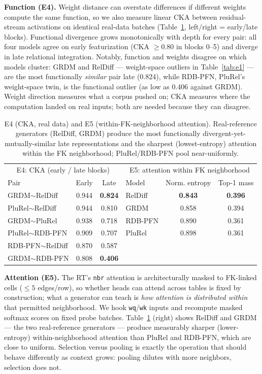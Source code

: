 \documentclass{article}
\begin{document}
\textbf{Function (E4).} Weight distance can overstate differences if different weights compute the same function, so we also measure linear CKA between residual-stream activations on identical real-data batches (Table~\ref{tab:e4cka}, left/right = early/late blocks). Functional divergence grows monotonically with depth for every pair: all four models agree on early featurization (CKA $\geq 0.80$ in blocks 0--5) and diverge in late relational integration. Notably, function and weights disagree on which models cluster: GRDM and RelDiff --- weight-space outliers in Table~\ref{tab:e1} --- are the most functionally \emph{similar} pair late (0.824), while RDB-PFN, PluRel's weight-space twin, is the functional outlier (as low as 0.406 against GRDM). Weight direction measures what a corpus pushed on; CKA measures where the computation landed on real inputs; both are needed because they can disagree.

\begin{table}[t]
\caption{E4 (CKA, real data) and E5 (within-FK-neighborhood attention). Real-reference generators (RelDiff, GRDM) produce the most functionally divergent-yet-mutually-similar late representations and the sharpest (lowest-entropy) attention within the FK neighborhood; PluRel/RDB-PFN pool near-uniformly.}
\label{tab:e4cka}
\centering
\small
\begin{tabular}{lcc|lcc}
\toprule
\multicolumn{3}{c|}{E4: CKA (early / late blocks)} & \multicolumn{3}{c}{E5: attention within FK neighborhood} \\
Pair & Early & Late & Model & Norm. entropy & Top-1 mass \\
\midrule
GRDM$\sim$RelDiff  & 0.944 & \textbf{0.824} & RelDiff & \textbf{0.843} & \textbf{0.396} \\
PluRel$\sim$RelDiff& 0.944 & 0.810          & GRDM    & 0.858 & 0.394 \\
GRDM$\sim$PluRel   & 0.938 & 0.718          & RDB-PFN & 0.890 & 0.361 \\
PluRel$\sim$RDB-PFN& 0.909 & 0.707          & PluRel  & 0.898 & 0.361 \\
RDB-PFN$\sim$RelDiff&0.870 & 0.587          & & & \\
GRDM$\sim$RDB-PFN  & 0.808 & \textbf{0.406} & & & \\
\bottomrule
\end{tabular}
\end{table}

\textbf{Attention (E5).} The RT's \texttt{nbr} attention is architecturally masked to FK-linked cells ($\leq 5$ edges/row), so whether heads can attend across tables is fixed by construction; what a generator can teach is \emph{how attention is distributed within} that permitted neighborhood. We hook \texttt{wq}/\texttt{wk} inputs and recompute masked softmax scores on fixed probe batches. Table~\ref{tab:e4cka} (right) shows RelDiff and GRDM --- the two real-reference generators --- produce measurably sharper (lower-entropy) within-neighborhood attention than PluRel and RDB-PFN, which are close to uniform. Selection versus pooling is exactly the operation that should behave differently as context grows: pooling dilutes with more neighbors, selection does not.
\end{document}
